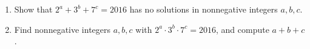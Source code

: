 \begin{enumerate}
\item[(a)] Show that $2^a+3^b+7^c=2016$ has no solutions in nonnegative integers $a,b,c$.
\item[(b)] Find nonnegative integers $a,b,c$ with $2^a\cdot3^b\cdot7^c=2016$, and compute $a+b+c$.
\end{enumerate}
